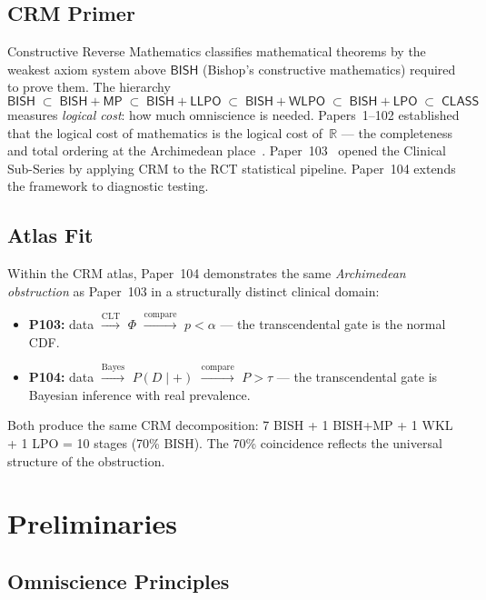 \documentclass[11pt,a4paper]{article}
\theoremstyle{plain}
\theoremstyle{definition}
\newcommand{\BISH}{\textsf{BISH}}
\newcommand{\WLPO}{\textsf{WLPO}}
\newcommand{\LLPO}{\textsf{LLPO}}
\newcommand{\LPO}{\textsf{LPO}}
\newcommand{\MP}{\textsf{MP}}
\newcommand{\CLASS}{\textsf{CLASS}}
\newcommand{\R}{\mathbb{R}}
\begin{document}
\subsection{CRM Primer}

Constructive Reverse Mathematics classifies mathematical theorems by the weakest axiom system above $\BISH$ (Bishop's constructive mathematics) required to prove them.  The hierarchy
\[
  \BISH \;\subset\; \BISH{+}\MP \;\subset\; \BISH{+}\LLPO \;\subset\; \BISH{+}\WLPO \;\subset\; \BISH{+}\LPO \;\subset\; \CLASS
\]
measures \emph{logical cost}: how much omniscience is needed.  Papers~1--102 established that the logical cost of mathematics is the logical cost of~$\R$ --- the completeness and total ordering at the Archimedean place~\cite{lee-crm-p98}.  Paper~103~\cite{lee-crm-p103} opened the Clinical Sub-Series by applying CRM to the RCT statistical pipeline.  Paper~104 extends the framework to diagnostic testing.

\subsection{Atlas Fit}

Within the CRM atlas, Paper~104 demonstrates the same \emph{Archimedean obstruction} as Paper~103 in a structurally distinct clinical domain:
\begin{itemize}[nosep]
\item \textbf{P103:} data $\xrightarrow{\text{CLT}}$ $\Phi$ $\xrightarrow{\text{compare}}$ $p < \alpha$ --- the transcendental gate is the normal CDF.
\item \textbf{P104:} data $\xrightarrow{\text{Bayes}}$ $P(D\mid+)$ $\xrightarrow{\text{compare}}$ $P > \tau$ --- the transcendental gate is Bayesian inference with real prevalence.
\end{itemize}
Both produce the same CRM decomposition: 7 BISH + 1 BISH+MP + 1 WKL + 1 LPO = 10 stages (70\% BISH).  The 70\% coincidence reflects the universal structure of the obstruction.

\section{Preliminaries}\label{sec:prelim}

\subsection{Omniscience Principles}
\end{document}
